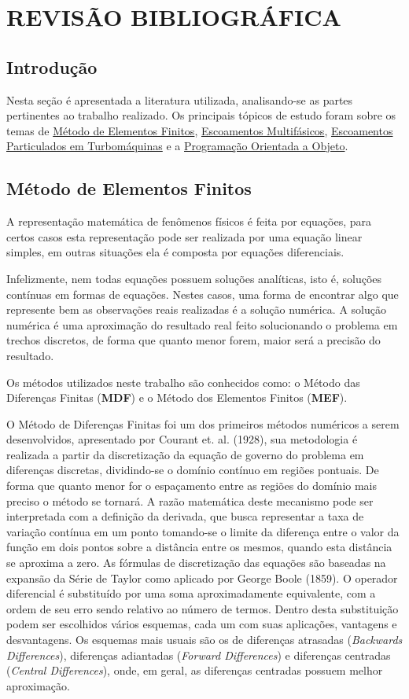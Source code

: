 \chapter{REVISÃO BIBLIOGRÁFICA}
\label{rev_bib}
\section{\textbf{Introdução}}
Nesta seção é apresentada a literatura utilizada, analisando-se as partes pertinentes ao trabalho realizado. Os principais tópicos de estudo foram sobre os temas de \hyperref[sec_rev_MEF]{Método de Elementos Finitos}, \hyperref[sec_rev_MF]{Escoamentos Multifásicos}, \hyperref[sec_rev_EP]{Escoamentos Particulados em Turbomáquinas} e a \hyperref[sec_rev_POO]{Programação Orientada a Objeto}.

\section{\textbf{Método de Elementos Finitos}}
\label{sec_rev_MEF}
A representação matemática de fenômenos físicos é feita por equações, para certos casos esta representação pode ser realizada por uma equação linear simples, em outras situações ela é composta por equações diferenciais.

Infelizmente, nem todas equações possuem soluções analíticas, isto é, soluções contínuas em formas de equações.
Nestes casos, uma forma de encontrar algo que represente bem as observações reais realizadas é a solução numérica.
A solução numérica é uma aproximação do resultado real feito solucionando o problema em trechos discretos, de forma que quanto menor forem, maior será a precisão do resultado.

Os métodos utilizados neste trabalho são conhecidos como: o Método das Diferenças Finitas (\textbf{MDF}) e o Método dos Elementos Finitos (\textbf{MEF}).

O Método de Diferenças Finitas foi um dos primeiros métodos numéricos a serem desenvolvidos, apresentado por Courant et. al. (1928)\cite{Courant-1928}, sua metodologia é realizada a partir da discretização da equação de governo do problema em diferenças discretas, dividindo-se o domínio contínuo em regiões pontuais.
De forma que quanto menor for o espaçamento entre as regiões do domínio mais preciso o método se tornará.
A razão matemática deste mecanismo pode ser interpretada com a definição da derivada, que busca representar a taxa de variação contínua em um ponto tomando-se o limite da diferença entre o valor da função em dois pontos sobre a distância entre os mesmos, quando esta distância se aproxima a zero.
As fórmulas de discretização das equações são baseadas na expansão da Série de Taylor como aplicado por George Boole (1859)\cite{Boole-1859}.
O operador diferencial é substituído por uma soma aproximadamente equivalente, com a ordem de seu erro sendo relativo ao número de termos.
Dentro desta substituição podem ser escolhidos vários esquemas, cada um com suas aplicações, vantagens e desvantagens.
Os esquemas mais usuais são os de diferenças atrasadas (\textit{Backwards Differences}), diferenças adiantadas (\textit{Forward Differences}) e diferenças centradas (\textit{Central Differences}), onde, em geral, as diferenças centradas possuem melhor aproximação.

